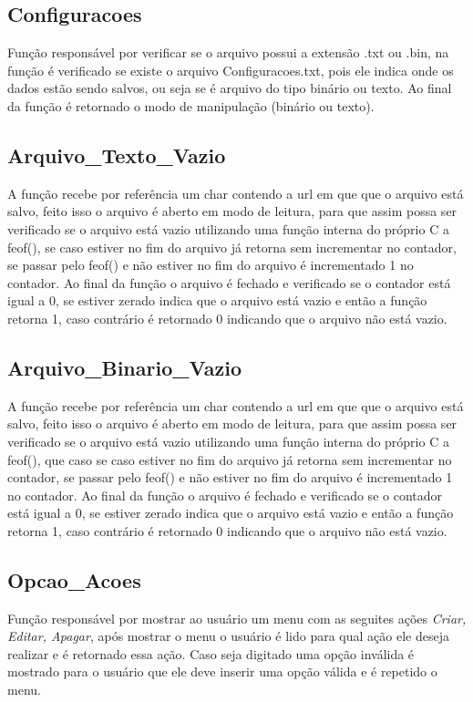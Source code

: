 \documentclass{article}
\begin{document}
\subsection{Configuracoes}
	Função responsável por verificar se o arquivo possui a extensão .txt ou .bin, na função é verificado se existe o arquivo Configuracoes.txt, pois ele indica onde os dados estão sendo salvos, ou seja se é arquivo do tipo binário ou texto. Ao final da função é retornado o modo de manipulação (binário ou texto).
\subsection{Arquivo\_Texto\_Vazio}
	A função recebe por referência um char contendo a url em que que o arquivo está salvo, feito isso o arquivo é aberto em modo de leitura,  para que assim possa ser verificado se o arquivo está vazio utilizando uma função interna do próprio C a feof(), se caso estiver no fim do arquivo já retorna sem incrementar no contador, se passar pelo feof() e não estiver no fim do arquivo é incrementado 1 no contador. Ao final da função o arquivo é fechado e verificado se o contador está igual a 0, se estiver zerado indica que o arquivo está vazio e então a função retorna 1, caso contrário é retornado 0 indicando que o arquivo não está vazio. 
\subsection{Arquivo\_Binario\_Vazio}
	A função recebe por referência um char contendo a url em que que o arquivo está salvo, feito isso o arquivo é aberto em modo de leitura, para que assim possa ser verificado se o arquivo está vazio utilizando uma função interna do próprio C a feof(), que caso se caso estiver no fim do arquivo já retorna sem incrementar no contador, se passar pelo feof() e não estiver no fim do arquivo é incrementado 1 no contador. Ao final da função o arquivo é fechado e verificado se o contador está igual a 0, se estiver zerado indica que o arquivo está vazio e então a função retorna 1, caso contrário é retornado 0 indicando que o arquivo não está vazio. 
\subsection{Opcao\_Acoes}
	Função responsável por mostrar ao usuário um menu com as seguites ações \textit{Criar, Editar, Apagar}, após mostrar o menu o usuário é lido para qual ação ele deseja realizar e é retornado essa ação. Caso seja digitado uma opção inválida é mostrado para o usuário que ele deve inserir uma opção válida e é repetido o menu.
\end{document}
